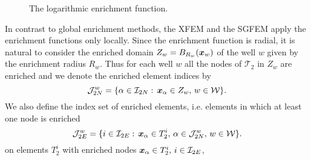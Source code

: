 \begin{figure}[!htb]
  \begin{center}         
    \def\svgwidth{0.5\textwidth}
    
  \end{center}
  \caption{The logarithmic enrichment function.}
  \label{fig:enrich_func}
\end{figure}


In contrast to global enrichment methods, the XFEM and the SGFEM apply the enrichment functions only locally. 
Since the enrichment function is radial, it is natural to consider the enriched domain $Z_w = B_{R_w}(\mathbf{\boldsymbol{x}}_w)$
of the well $w$ given by the enrichment radius $R_w$. Thus for each well $w$ all the nodes of $\mathcal{T}_2$
in $Z_w$ are enriched and we denote the enriched element indices by
\begin{equation} \label{eqn:prim_enriched_nodes}
    \mathcal{J}^w_{2N} = \{\alpha\in\mathcal{I}_{2N}:\, \mathbf{\boldsymbol{x}}_\alpha\in Z_w, \, w\in\mathcal{W}\}.
\end{equation}
We also define the index set of enriched elements, i.e. elements in which at least one node is enriched
\begin{equation} \label{eqn:prim_enriched_elements}
    \mathcal{J}^w_{2E} = \{i\in\mathcal{I}_{2E}:\, \mathbf{\boldsymbol{x}}_\alpha\in T^i_2,\, \alpha\in\mathcal{J}^w_{2N},\, w\in\mathcal{W} \}.
\end{equation}
on elements $T_2^i$ with enriched nodes $\mathbf{\boldsymbol{x}}_\alpha\in{T_2^i},\, i\in\mathcal{I}_{2E}$,

